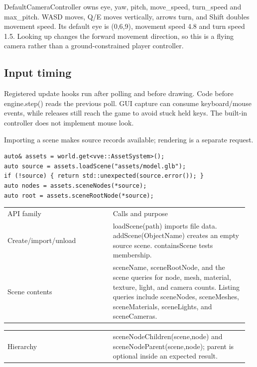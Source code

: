 \documentclass[11pt,a4paper]{article}
\begin{document}
DefaultCameraController owns eye, yaw, pitch, move\_speed, turn\_speed and max\_pitch. WASD moves, Q/E moves vertically, arrows turn, and Shift doubles movement speed. Its default eye is (0,6,9), movement speed 4.8 and turn speed 1.5. Looking up changes the forward movement direction, so this is a flying camera rather than a ground-constrained player controller.

\subsection*{Input timing}
Registered update hooks run after polling and before drawing. Code before engine.step() reads the previous poll. GUI capture can consume keyboard/mouse events, while releases still reach the game to avoid stuck held keys. The built-in controller does not implement mouse look.

\label{core-14}
Importing a scene makes source records available; rendering is a separate request.

\begin{lstlisting}[language={}]
auto& assets = world.get<vve::AssetSystem>();
auto source = assets.loadScene("assets/model.glb");
if (!source) { return std::unexpected(source.error()); }
auto nodes = assets.sceneNodes(*source);
auto root = assets.sceneRootNode(*source);
\end{lstlisting}

{\small
\begin{longtable}{@{}p{0.42\linewidth}p{0.54\linewidth}@{}}
API family & Calls and purpose \\
Create/import/unload & loadScene(path) imports file data. addScene(ObjectName) creates an empty source scene. containsScene tests membership. \\
Scene contents & sceneName, sceneRootNode, and the scene queries for node, mesh, material, texture, light, and camera counts. Listing queries include sceneNodes, sceneMeshes, sceneMaterials, sceneLights, and sceneCameras. \\
\end{longtable}
}

{\small
\begin{longtable}{@{}p{0.42\linewidth}p{0.54\linewidth}@{}}
Hierarchy & sceneNodeChildren(scene,node) and sceneNodeParent(scene,node); parent is optional inside an expected result. \\
\end{longtable}
}
\end{document}

